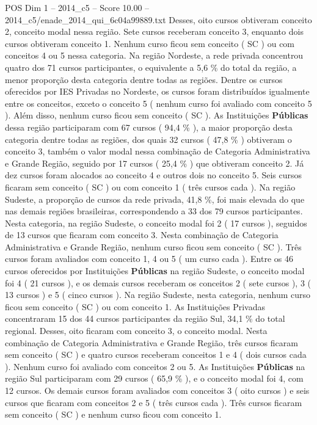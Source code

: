 \begin{textsample}{POS Dim 1 – 2014\_c5 – Score 10.00 – 2014\_c5/enade\_2014\_qui\_6c04a99889.txt}
Desses, oito cursos obtiveram conceito 2, conceito modal nessa região.
Sete cursos receberam conceito 3, enquanto dois cursos obtiveram conceito 1.
Nenhum curso ficou sem conceito ( SC ) ou com conceitos 4 ou 5 nessa categoria.
Na região Nordeste, a rede privada concentrou quatro dos 71 cursos participantes, o equivalente a 5,6 \% do total da região, a menor proporção desta categoria dentre todas as regiões.
Dentre os cursos oferecidos por IES Privadas no Nordeste, os cursos foram distribuídos igualmente entre os conceitos, exceto o conceito 5 ( nenhum curso foi avaliado com conceito 5 ).
Além disso, nenhum curso ficou sem conceito ( SC ).
As Instituições \textbf{Públicas} dessa região participaram com 67 cursos ( 94,4 \% ), a maior proporção desta categoria dentre todas as regiões, dos quais 32 cursos ( 47,8 \% ) obtiveram o conceito 3, também o valor modal nessa combinação de Categoria Administrativa e Grande Região, seguido por 17 cursos ( 25,4 \% ) que obtiveram conceito 2.
Já dez cursos foram alocados ao conceito 4 e outros dois no conceito 5.
Seis cursos ficaram sem conceito ( SC ) ou com conceito 1 ( três cursos cada ).
Na região Sudeste, a proporção de cursos da rede privada, 41,8 \%, foi mais elevada do que nas demais regiões brasileiras, correspondendo a 33 dos 79 cursos participantes.
Nesta categoria, na região Sudeste, o conceito modal foi 2 ( 17 cursos ), seguidos de 13 cursos que ficaram com conceito 3.
Nesta combinação de Categoria Administrativa e Grande Região, nenhum curso ficou sem conceito ( SC ).
Três cursos foram avaliados com conceito 1, 4 ou 5 ( um curso cada ).
Entre os 46 cursos oferecidos por Instituições \textbf{Públicas} na região Sudeste, o conceito modal foi 4 ( 21 cursos ), e os demais cursos receberam os conceitos 2 ( sete cursos ), 3 ( 13 cursos ) e 5 ( cinco cursos ).
Na região Sudeste, nesta categoria, nenhum curso ficou sem conceito ( SC ) ou com conceito 1.
As Instituições Privadas concentraram 15 dos 44 cursos participantes da região Sul, 34,1 \% do total regional.
Desses, oito ficaram com conceito 3, o conceito modal.
Nesta combinação de Categoria Administrativa e Grande Região, três cursos ficaram sem conceito ( SC ) e quatro cursos receberam conceitos 1 e 4 ( dois cursos cada ).
Nenhum curso foi avaliado com conceitos 2 ou 5.
As Instituições \textbf{Públicas} na região Sul participaram com 29 cursos ( 65,9 \% ), e o conceito modal foi 4, com 12 cursos.
Os demais cursos foram avaliados com conceitos 3 ( oito cursos ) e seis cursos que ficaram com conceitos 2 e 5 ( três cursos cada ).
Três cursos ficaram sem conceito ( SC ) e nenhum curso ficou com conceito 1.

\end{textsample}
